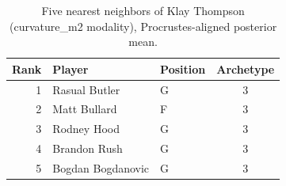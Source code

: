 \begin{table}[htbp]
  \centering\small
  \begin{tabular}{rllc}
    \toprule
    Rank & Player & Position & Archetype \\
    \midrule
    1 & Rasual Butler & G & 3 \\
    2 & Matt Bullard & F & 3 \\
    3 & Rodney Hood & G & 3 \\
    4 & Brandon Rush & G & 3 \\
    5 & Bogdan Bogdanovic & G & 3 \\
    \bottomrule
  \end{tabular}
  \caption{Five nearest neighbors of Klay Thompson (curvature_m2 modality), Procrustes-aligned posterior mean.}
  \label{tab:Klay_Thompson_neighbors_curvature_m2}
\end{table}

